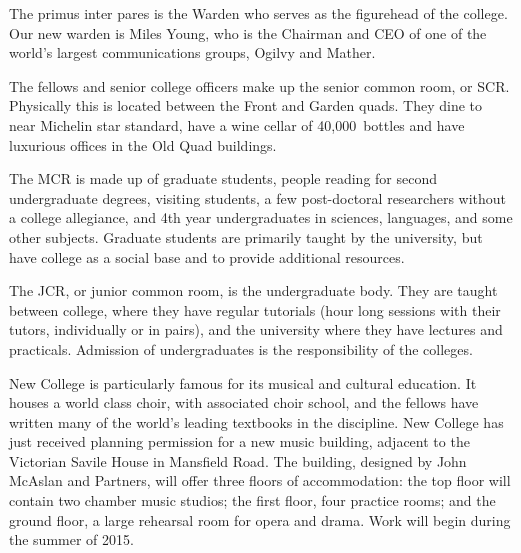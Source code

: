 The primus inter pares is the Warden who serves as the figurehead of the college. Our new warden is Miles Young, who is the Chairman and CEO of one of the world's largest communications groups, Ogilvy and Mather.

The fellows and senior college officers make up the senior common room, or SCR. Physically this is located between the Front and Garden quads. They dine to near Michelin star standard, have a wine cellar of 40,000~bottles and have luxurious offices in the Old Quad buildings.

The MCR is made up of graduate students, people reading for second undergraduate degrees, visiting students, a few post-doctoral researchers without a college allegiance, and 4th year undergraduates in sciences, languages, and some other subjects. Graduate students are primarily taught by the university, but have college as a social base and to provide additional resources.

The JCR, or junior common room, is the undergraduate body. They are taught between college,
where they have regular tutorials (hour long sessions with their tutors, individually or in pairs), and the university where they have lectures and practicals. Admission of undergraduates is the responsibility of the colleges.

New College is particularly famous for its musical and cultural education. It houses a world class choir, with associated choir school, and the fellows have written many of the world's leading textbooks in the discipline. New College has just received planning permission for a new music building, adjacent to the Victorian Savile House in Mansfield Road. The building, designed by John McAslan and Partners, will offer three floors of accommodation: the top floor will contain two chamber music studios; the first floor, four practice rooms; and the ground floor, a large rehearsal room for opera and drama. Work will begin during the summer of 2015.
